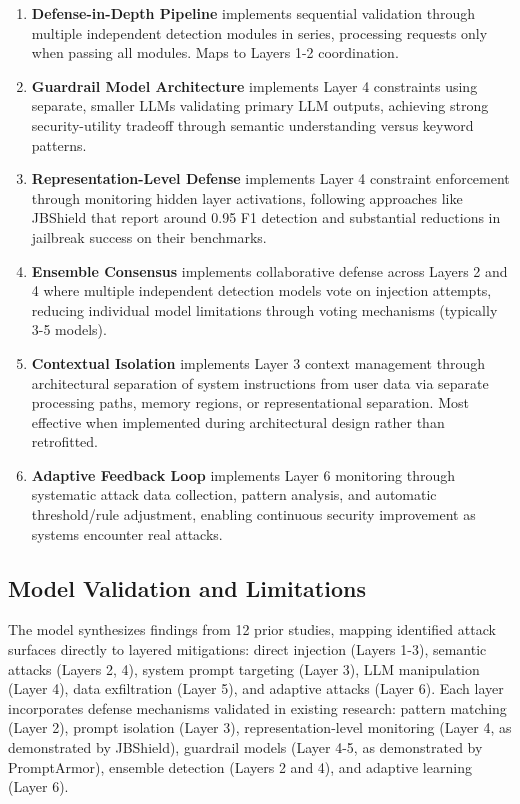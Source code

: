\documentclass[conference]{IEEEtran}
\begin{document}
\begin{enumerate}
    \item \textbf{Defense-in-Depth Pipeline} implements sequential validation through multiple independent detection modules in series, processing requests only when passing all modules. Maps to Layers 1-2 coordination.
    \item \textbf{Guardrail Model Architecture} implements Layer 4 constraints using separate, smaller LLMs validating primary LLM outputs, achieving strong security-utility tradeoff through semantic understanding versus keyword patterns.
    \item \textbf{Representation-Level Defense} implements Layer 4 constraint enforcement through monitoring hidden layer activations, following approaches like JBShield that report around 0.95 F1 detection and substantial reductions in jailbreak success on their benchmarks.
    \item \textbf{Ensemble Consensus} implements collaborative defense across Layers 2 and 4 where multiple independent detection models vote on injection attempts, reducing individual model limitations through voting mechanisms (typically 3-5 models).
    \item \textbf{Contextual Isolation} implements Layer 3 context management through architectural separation of system instructions from user data via separate processing paths, memory regions, or representational separation. Most effective when implemented during architectural design rather than retrofitted.
    \item \textbf{Adaptive Feedback Loop} implements Layer 6 monitoring through systematic attack data collection, pattern analysis, and automatic threshold/rule adjustment, enabling continuous security improvement as systems encounter real attacks.
\end{enumerate}

\subsection{Model Validation and Limitations}
The model synthesizes findings from 12 prior studies, mapping identified attack surfaces directly to layered mitigations: direct injection (Layers 1-3), semantic attacks (Layers 2, 4), system prompt targeting (Layer 3), LLM manipulation (Layer 4), data exfiltration (Layer 5), and adaptive attacks (Layer 6). Each layer incorporates defense mechanisms validated in existing research: pattern matching (Layer 2), prompt isolation (Layer 3), representation-level monitoring (Layer 4, as demonstrated by JBShield), guardrail models (Layer 4-5, as demonstrated by PromptArmor), ensemble detection (Layers 2 and 4), and adaptive learning (Layer 6).
\end{document}
